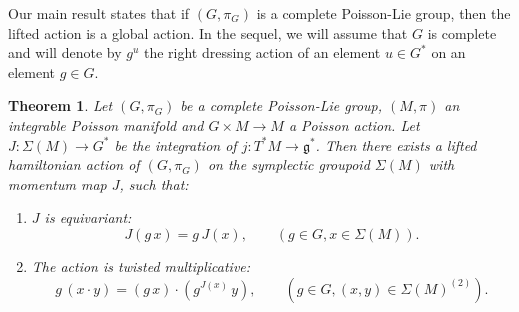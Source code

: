 \documentclass[a4paper,11pt]{amsart}
\newtheorem{thm}{Theorem}[section]
\theoremstyle{definition}
\theoremstyle{remark}
\begin{document}
Our main result states that if $(G,\pi_{G})$ is a complete Poisson-Lie group, then the lifted action is a global
action. In the sequel, we will assume that $G$ is complete and will denote by $g^u$ the right dressing action of
an element $u\in G^*$ on an element $g\in G$.

\begin{thm}
\label{thm:lift:actions} Let $(G,\pi_G)$ be a complete Poisson-Lie
group, $(M,\pi)$ an integrable Poisson manifold and $G\times M\to
M$ a Poisson action. Let $J:\Sigma(M)\to G^*$ be the integration
of $j:T^*M\to{\mathfrak{g}}^*$. Then there exists a lifted hamiltonian action
of $(G,\pi_G)$ on the symplectic groupoid $\Sigma(M)$ with
momentum map $J$, such that:
\begin{enumerate}
\item $J$ is equivariant:
\[ J(g\,x)=g\,J(x),\qquad (g\in G, x\in\Sigma(M)). \]
\item The action is twisted multiplicative:
\[
g\,(x\cdot y)=(g\, x)\cdot (g^{J(x)}\, y),\qquad (g\in G,(x,y)\in\Sigma(M)^{(2)}).
\]
\end{enumerate}
\end{thm}
\end{document}
